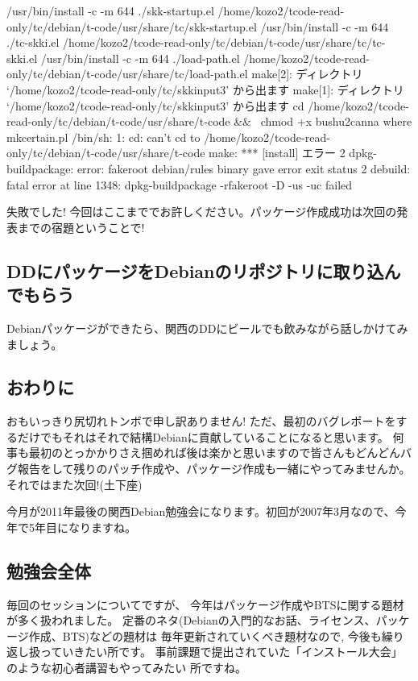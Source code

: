 \documentclass[mingoth,a4paper]{jsarticle}
\begin{document}
\begin{commandline}
 /usr/bin/install -c -m 644 ./skk-startup.el /home/kozo2/tcode-read-only/tc/debian/t-code/usr/share/tc/skk-startup.el
 /usr/bin/install -c -m 644 ./tc-skki.el /home/kozo2/tcode-read-only/tc/debian/t-code/usr/share/tc/tc-skki.el
 /usr/bin/install -c -m 644 ./load-path.el /home/kozo2/tcode-read-only/tc/debian/t-code/usr/share/tc/load-path.el
make[2]: ディレクトリ `/home/kozo2/tcode-read-only/tc/skkinput3' から出ます
make[1]: ディレクトリ `/home/kozo2/tcode-read-only/tc/skkinput3' から出ます
cd /home/kozo2/tcode-read-only/tc/debian/t-code/usr/share/t-code && \
                chmod +x bushu2canna where mkcertain.pl
/bin/sh: 1: cd: can't cd to /home/kozo2/tcode-read-only/tc/debian/t-code/usr/share/t-code
make: *** [install] エラー 2
dpkg-buildpackage: error: fakeroot debian/rules binary gave error exit status 2
debuild: fatal error at line 1348:
dpkg-buildpackage -rfakeroot -D -us -uc failed
\end{commandline}

失敗でした!
今回はここまででお許しください。パッケージ作成成功は次回の発表までの宿題ということで!

\subsection{DDにパッケージをDebianのリポジトリに取り込んでもらう}

Debianパッケージができたら、関西のDDにビールでも飲みながら話しかけてみましょう。

\subsection{おわりに}

おもいっきり尻切れトンボで申し訳ありません!
ただ、最初のバグレポートをするだけでもそれはそれで結構Debianに貢献していることになると思います。
何事も最初のとっかかりさえ掴めれば後は楽かと思いますので皆さんもどんどんバグ報告をして残りのパッチ作成や、パッケージ作成も一緒にやってみませんか。
それではまた次回!(土下座)

\clearpage
{}

今月が2011年最後の関西Debian勉強会になります。初回が2007年3月なので、今年で5年目になりますね。

\subsection{勉強会全体}

毎回のセッションについてですが、
今年はパッケージ作成やBTSに関する題材が多く扱われました。
定番のネタ(Debianの入門的なお話、ライセンス、パッケージ作成、BTS)などの題材は
毎年更新されていくべき題材なので, 今後も繰り返し扱っていきたい所です。
事前課題で提出されていた「インストール大会」のような初心者講習もやってみたい
所ですね。
\end{document}
